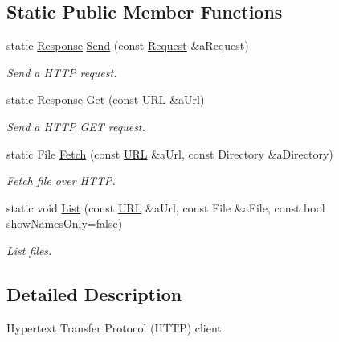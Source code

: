 \subsection*{Static Public Member Functions}
\begin{DoxyCompactItemize}
\item 
static \hyperlink{classostk_1_1io_1_1ip_1_1tcp_1_1http_1_1_response}{Response} \hyperlink{classostk_1_1io_1_1ip_1_1tcp_1_1http_1_1_client_ac641999a75f8abd53a7490e8f22a7189}{Send} (const \hyperlink{classostk_1_1io_1_1ip_1_1tcp_1_1http_1_1_request}{Request} \&a\+Request)
\begin{DoxyCompactList}\small\item\em Send a H\+T\+TP request. \end{DoxyCompactList}\item 
static \hyperlink{classostk_1_1io_1_1ip_1_1tcp_1_1http_1_1_response}{Response} \hyperlink{classostk_1_1io_1_1ip_1_1tcp_1_1http_1_1_client_a3a84e295e2fb2274a010f791edd8a9d6}{Get} (const \hyperlink{classostk_1_1io_1_1_u_r_l}{U\+RL} \&a\+Url)
\begin{DoxyCompactList}\small\item\em Send a H\+T\+TP G\+ET request. \end{DoxyCompactList}\item 
static File \hyperlink{classostk_1_1io_1_1ip_1_1tcp_1_1http_1_1_client_a58b0f28bf092cb3a6a797ae5d3779f79}{Fetch} (const \hyperlink{classostk_1_1io_1_1_u_r_l}{U\+RL} \&a\+Url, const Directory \&a\+Directory)
\begin{DoxyCompactList}\small\item\em Fetch file over H\+T\+TP. \end{DoxyCompactList}\item 
static void \hyperlink{classostk_1_1io_1_1ip_1_1tcp_1_1http_1_1_client_a4b02fb4cec2bb63499e38c1311fb45bb}{List} (const \hyperlink{classostk_1_1io_1_1_u_r_l}{U\+RL} \&a\+Url, const File \&a\+File, const bool show\+Names\+Only=false)
\begin{DoxyCompactList}\small\item\em List files. \end{DoxyCompactList}\end{DoxyCompactItemize}


\subsection{Detailed Description}
Hypertext Transfer Protocol (H\+T\+TP) client. 


